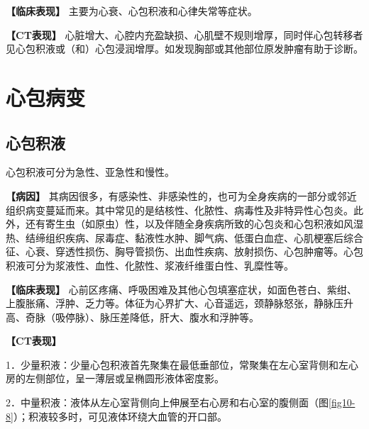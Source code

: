 \textbf{【临床表现】} 主要为心衰、心包积液和心律失常等症状。

\textbf{【CT表现】}
心脏增大、心腔内充盈缺损、心肌壁不规则增厚，同时伴心包转移者见心包积液或（和）心包浸润增厚。如发现胸部或其他部位原发肿瘤有助于诊断。

\section{心包病变}

\subsection{心包积液}

心包积液可分为急性、亚急性和慢性。

\textbf{【病因】}
其病因很多，有感染性、非感染性的，也可为全身疾病的一部分或邻近组织病变蔓延而来。其中常见的是结核性、化脓性、病毒性及非特异性心包炎。此外，还有寄生虫（如原虫）性，以及伴随全身疾病所致的心包炎和心包积液如风湿热、结缔组织疾病、尿毒症、黏液性水肿、脚气病、低蛋白血症、心肌梗塞后综合征、心衰、穿透性损伤、胸导管损伤、出血性疾病、放射损伤、心包肿瘤等。心包积液可分为浆液性、血性、化脓性、浆液纤维蛋白性、乳糜性等。

\textbf{【临床表现】}
心前区疼痛、呼吸困难及其他心包填塞症状，如面色苍白、紫绀、上腹胀痛、浮肿、乏力等。体征为心界扩大、心音遥远，颈静脉怒张，静脉压升高、奇脉（吸停脉）、脉压差降低，肝大、腹水和浮肿等。

\textbf{【CT表现】}

1．少量积液：少量心包积液首先聚集在最低垂部位，常聚集在左心室背侧和左心房的左侧部位，呈一薄层或呈椭圆形液体密度影。

2．中量积液：液体从左心室背侧向上伸展至右心房和右心室的腹侧面（图\ref{fig10-8}）；积液较多时，可见液体环绕大血管的开口部。

